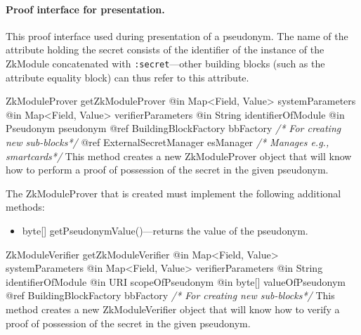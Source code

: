     \paragraph{Proof interface for presentation.}
    This proof interface used during presentation of a pseudonym.
    The name of the attribute holding the secret consists of the identifier
    of the instance of the ZkModule concatenated with \texttt{:secret}---other
    building blocks (such as the attribute equality block) can thus refer to this
    attribute.
      \begin{method}
      {ZkModuleProver}
      {getZkModuleProver}
      {
        {@in Map<Field, Value> systemParameters}
        {@in Map<Field, Value> verifierParameters}
        {@in String identifierOfModule}
        {@in Pseudonym pseudonym}
        {@ref BuildingBlockFactory bbFactory \textrm{\emph{/* For creating new sub-blocks*/}}}
        {@ref ExternalSecretManager esManager \textrm{\emph{/* Manages e.g., smartcards*/}}}
      }
      This method creates a new ZkModuleProver object that will know how to
      perform a proof of possession of the secret in the given pseudonym.

      The ZkModuleProver that is created must implement the following additional methods:
      \begin{itemize}
        \item byte[] getPseudonymValue()---returns the value of the pseudonym.
      \end{itemize}
      \end{method}
      \begin{method}
      {ZkModuleVerifier}
      {getZkModuleVerifier}
      {
        {@in Map<Field, Value> systemParameters}
        {@in Map<Field, Value> verifierParameters}
        {@in String identifierOfModule}
        {@in URI scopeOfPseudonym}
        {@in byte[] valueOfPseudonym}
        {@ref BuildingBlockFactory bbFactory \textrm{\emph{/* For creating new sub-blocks*/}}}
      }
      This method creates a new ZkModuleVerifier object that will know how to
      verify a proof of possession of the secret in the given pseudonym.
      \end{method}
